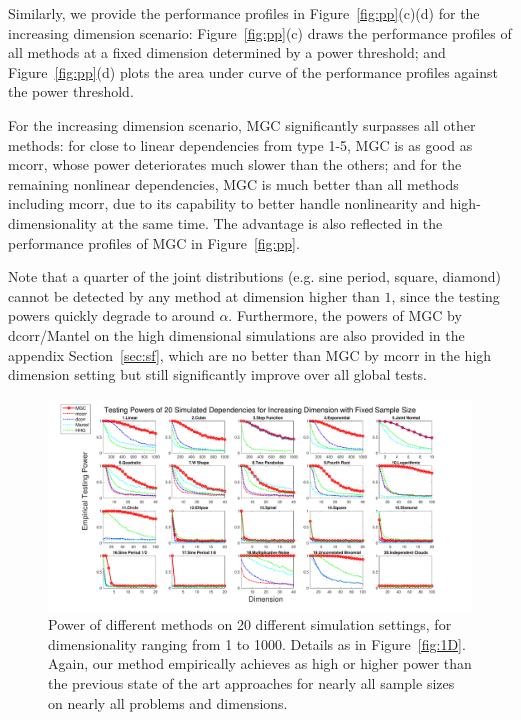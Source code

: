 \documentclass[11pt]{article}
\begin{document}
Similarly, we provide the performance profiles in Figure~\ref{fig:pp}(c)(d) for the increasing dimension scenario: Figure~\ref{fig:pp}(c) draws the performance profiles of all methods at a fixed dimension determined by a power threshold; and Figure~\ref{fig:pp}(d) plots the area under curve of the performance profiles against the power threshold.

For the increasing dimension scenario, MGC significantly surpasses all other methods: for close to linear dependencies from type 1-5, MGC is as good as mcorr, whose power deteriorates much slower than the others; and for the remaining nonlinear dependencies, MGC is much better than all methods including mcorr, due to its capability to better handle nonlinearity and high-dimensionality at the same time. The advantage is also reflected in the performance profiles of MGC in Figure~\ref{fig:pp}. 

Note that a quarter of the joint distributions (e.g. sine period, square, diamond) cannot be detected by any method at dimension higher than $1$, since the testing powers quickly degrade to around $\alpha$. Furthermore, the powers of MGC by dcorr/Mantel on the high dimensional simulations are also provided in the appendix Section~\ref{sec:sf}, which are no better than MGC by mcorr in the high dimension setting but still significantly improve over all global tests.


\begin{figure}[htbp]
\includegraphics[width=1.0\textwidth]{../Figures/Fig5}
\caption{Power of different methods on 20 different simulation settings, for dimensionality ranging from 1 to 1000.  Details as in Figure~\ref{fig:1D}.
Again, our method empirically achieves as high or higher power than the previous state of the art approaches for nearly all sample sizes on nearly all problems and dimensions.
}
\label{fig:nD}
\end{figure}
\end{document}
